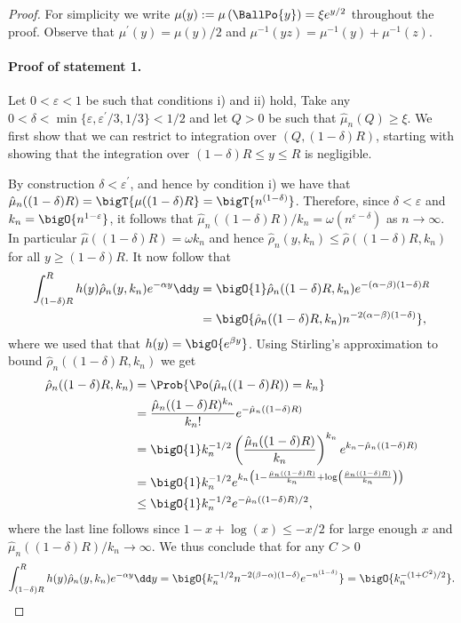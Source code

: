 \begin{proof} \hfill

For simplicity we write $\mu(y) := \mu\left(\BallPo{y}\right) = \xi e^{y/2}$ throughout the proof. Observe that $\mu^\prime(y) = \mu(y)/2$ and $\mu^{-1}(y z) = \mu^{-1}(y) + \mu^{-1}(z)$.


\paragraph{Proof of statement 1.}

Let $0 < \varepsilon < 1$ be such that conditions i) and ii) hold, 
Take any $0 < \delta < \min\{\varepsilon, \varepsilon^\prime/3,1/3\} < 1/2$ and let $Q > 0$ be such that $\hat{\mu}_n(Q) \ge \xi$. We first show that we can restrict to integration over $(Q, (1-\delta)R)$, starting with showing that the integration over $(1-\delta)R \le y \le R$ is negligible.

By construction $\delta < \varepsilon^\prime$, and hence by condition i) we have that $\hat{\mu}_n((1-\delta)R) = \bigT{\mu((1-\delta)R} = \bigT{n^{(1-\delta)}}$. Therefore, since $\delta<\varepsilon$ and $k_n = \bigO{n^{1-\varepsilon}}$, it follows that $\hat{\mu}_n((1-\delta)R)/k_n = \omega\left(n^{\varepsilon - \delta}\right)$ as $n \to \infty$. In particular $\hat{\mu}((1-\delta)R) = \omega{k_n}$ and hence $\hat{\rho}_n(y,k_n) \le \hat{\rho}((1-\delta)R,k_n)$ for all $y \ge (1-\delta)R$. It now follow that
\begin{align*}
	\int_{(1-\delta)R}^{R} h(y) \hat{\rho}_n(y,k_n) e^{-\alpha y} \dd y
	&= \bigO{1} \hat{\rho}_n((1-\delta)R,k_n) e^{-(\alpha-\beta)(1-\delta)R} \\
	&= \bigO{\hat{\rho}_n((1-\delta)R,k_n) n^{-2(\alpha-\beta)(1-\delta)}},
\end{align*}
where we used that that $h(y) = \bigO{e^{\beta y}}$.
Using Stirling's approximation to bound $\hat{\rho}_n((1-\delta)R,k_n)$ we get
\begin{align*}
	\hat{\rho}_n((1-\delta)R,k_n) &= \Prob{\Po(\hat{\mu}_n((1-\delta)R)) = k_n} \\
	&= \frac{\hat{\mu}_n((1-\delta)R)^{k_n}}{k_n!} e^{-\hat{\mu}_n((1-\delta)R)}\\
	&= \bigO{1} k_n^{-1/2} \left(\frac{\hat{\mu}_n((1-\delta)R)}{k_n}\right)^{k_n} e^{k_n - \hat{\mu}_n((1-\delta)R)}\\
	&= \bigO{1} k_n^{-1/2} e^{k_n\left(1 - \frac{\hat{\mu}_n((1-\delta)R)}{k_n}+ \log\left(\frac{\hat{\mu}_n((1-\delta)R)}{k_n}\right)\right)}\\
	&\le \bigO{1} k_n^{-1/2} e^{-\hat{\mu}_n((1-\delta)R)/2},
\end{align*}
where the last line follows since $1 - x + \log(x) \le -x/2$ for large enough $x$ and $\hat{\mu}_n((1-\delta)R)/k_n \to \infty$. We thus conclude that for any $C > 0$
\[
	\int_{(1-\delta)R}^{R} h(y) \hat{\rho}_n(y,k_n) e^{-\alpha y} \dd y
	= \bigO{k_n^{-1/2} n^{-2(\beta-\alpha)(1-\delta)} e^{-n^{(1-\delta)}}}
	= \bigO{k_n^{-(1+C^2)/2}}.
\]


\end{proof}
